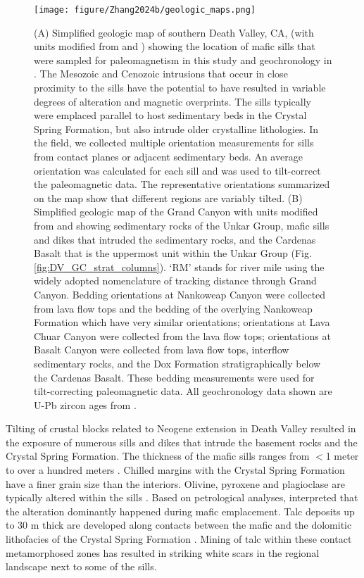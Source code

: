 \begin{figure}[h!]
\centering
\texttt{[image: figure/Zhang2024b/geologic\_maps.png]}
\caption[Simplified geologic maps of the Death Valley area and the Grand Canyon area]{\footnotesize (A) Simplified geologic map of southern Death Valley, CA, (with units modified from \cite{Workman2003a} and \cite{Wrucke2007a}) showing the location of mafic sills that were sampled for paleomagnetism in this study and geochronology in \cite{Mohr2024a}. The Mesozoic and Cenozoic intrusions that occur in close proximity to the sills have the potential to have resulted in variable degrees of alteration and magnetic overprints. The sills typically were emplaced parallel to host sedimentary beds in the Crystal Spring Formation, but also intrude older crystalline lithologies. In the field, we collected multiple orientation measurements for sills from contact planes or adjacent sedimentary beds. An average orientation was calculated for each sill and was used to tilt-correct the paleomagnetic data. The representative orientations summarized on the map show that different regions are variably tilted. (B) Simplified geologic map of the Grand Canyon with units modified from \cite{Billingsley2000a} and \cite{Billingsley2003a} showing sedimentary rocks of the Unkar Group, mafic sills and dikes that intruded the sedimentary rocks, and the Cardenas Basalt that is the uppermost unit within the Unkar Group (Fig. \ref{fig:DV_GC_strat_columns}). `RM' stands for river mile using the widely adopted nomenclature of tracking distance through Grand Canyon. Bedding orientations at Nankoweap Canyon were collected from lava flow tops and the bedding of the overlying Nankoweap Formation which have very similar orientations; orientations at Lava Chuar Canyon were collected from the lava flow tops; orientations at Basalt Canyon were collected from lava flow tops, interflow sedimentary rocks, and the Dox Formation stratigraphically below the Cardenas Basalt. These bedding measurements were used for tilt-correcting paleomagnetic data. All geochronology data shown are U-Pb zircon ages from \cite{Mohr2024a}.}
\label{fig:geologic_maps}
\end{figure}

Tilting of crustal blocks related to Neogene extension in Death Valley resulted in the exposure of numerous sills and dikes that intrude the basement rocks and the Crystal Spring Formation. The thickness of the mafic sills ranges from $<$1 meter to over a hundred meters \citep{Wright1968a, Hammond1983a}. Chilled margins with the Crystal Spring Formation have a finer grain size than the interiors. Olivine, pyroxene and plagioclase are typically altered within the sills \citep{Hammond1983a}. Based on petrological analyses, \cite{Hammond1983a} interpreted that the alteration dominantly happened during mafic emplacement. Talc deposits up to 30 m thick are developed along contacts between the mafic and the dolomitic lithofacies of the Crystal Spring Formation \citep{Wright1968a}. Mining of talc within these contact metamorphosed zones has resulted in striking white scars in the regional landscape next to some of the sills.

